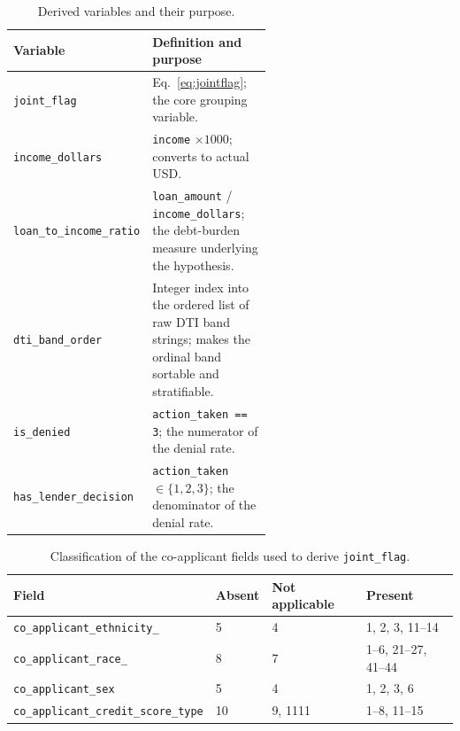 \documentclass[sigconf,balance=false]{acmart}
\begin{document}
\begin{table}[H]
\caption{Derived variables and their purpose.}
\label{tab:derived}
\centering
\footnotesize
\begin{tabular}{@{}lp{0.58\linewidth}@{}}
\toprule
Variable & Definition and purpose \\
\midrule
\texttt{joint\_\allowbreak flag} & Eq.~\ref{eq:jointflag}; the core grouping variable. \\
\texttt{income\_\allowbreak dollars} & \texttt{income} $\times 1000$; converts to actual USD. \\
\texttt{loan\_\allowbreak to\_\allowbreak income\_\allowbreak ratio} & \texttt{loan\_\allowbreak amount} / \texttt{income\_\allowbreak dollars}; the debt-burden measure underlying the hypothesis. \\
\texttt{dti\_\allowbreak band\_\allowbreak order} & Integer index into the ordered list of raw DTI band strings; makes the ordinal band sortable and stratifiable. \\
\texttt{is\_\allowbreak denied} & \texttt{action\_\allowbreak taken == 3}; the numerator of the denial rate. \\
\texttt{has\_\allowbreak lender\_\allowbreak decision} & \texttt{action\_\allowbreak taken} $\in \{1,2,3\}$; the denominator of the denial rate. \\
\bottomrule
\end{tabular}
\end{table}

\begin{table}[H]
\caption{Classification of the co-applicant fields used to derive
         \texttt{joint\_\allowbreak flag}.}
\label{tab:coapp}
\centering
\scriptsize
\begin{tabular}{@{}llll@{}}
\toprule
Field & Absent & Not applicable & Present \\
\midrule
\texttt{co\_\allowbreak applicant\_\allowbreak ethnicity\_\allowbreak 1}    & 5 & 4 & 1, 2, 3, 11--14 \\
\texttt{co\_\allowbreak applicant\_\allowbreak race\_\allowbreak 1}          & 8 & 7 & 1--6, 21--27, 41--44 \\
\texttt{co\_\allowbreak applicant\_\allowbreak sex}              & 5 & 4 & 1, 2, 3, 6 \\
\texttt{co\_\allowbreak applicant\_\allowbreak credit\_\allowbreak score\_\allowbreak type} & 10 & 9, 1111 & 1--8, 11--15 \\
\bottomrule
\end{tabular}
\end{table}
\end{document}
